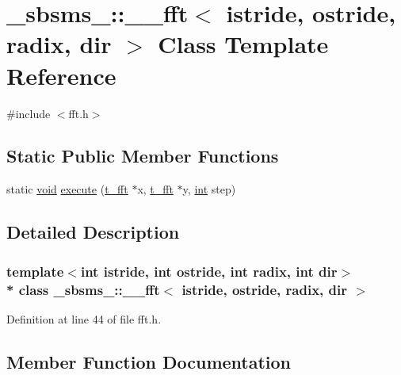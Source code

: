 \hypertarget{class__sbsms___1_1____fft}{}\section{\+\_\+sbsms\+\_\+\+:\+:\+\_\+\+\_\+fft$<$ istride, ostride, radix, dir $>$ Class Template Reference}
\label{class__sbsms___1_1____fft}


{\ttfamily \#include $<$fft.\+h$>$}

\subsection*{Static Public Member Functions}
\begin{DoxyCompactItemize}
\item 
static \hyperlink{sound_8c_ae35f5844602719cf66324f4de2a658b3}{void} \hyperlink{class__sbsms___1_1____fft_a120c47d9244cf3dc72d797871ff09ea0}{execute} (\hyperlink{namespace__sbsms___af5c6f976b2da21c36853e3b0c5995a54}{t\+\_\+fft} $\ast$x, \hyperlink{namespace__sbsms___af5c6f976b2da21c36853e3b0c5995a54}{t\+\_\+fft} $\ast$y, \hyperlink{xmltok_8h_a5a0d4a5641ce434f1d23533f2b2e6653}{int} step)
\end{DoxyCompactItemize}


\subsection{Detailed Description}
\subsubsection*{template$<$int istride, int ostride, int radix, int dir$>$\\*
class \+\_\+sbsms\+\_\+\+::\+\_\+\+\_\+fft$<$ istride, ostride, radix, dir $>$}



Definition at line 44 of file fft.\+h.



\subsection{Member Function Documentation}
